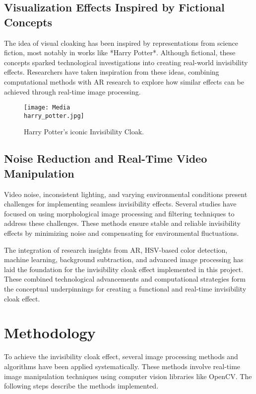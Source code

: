 \documentclass[onecolumn]{article} %
\begin{document}
\subsection{Visualization Effects Inspired by Fictional Concepts}
The idea of visual cloaking has been inspired by representations from science fiction, most notably in works like *Harry Potter*. Although fictional, these concepts sparked technological investigations into creating real-world invisibility effects. Researchers have taken inspiration from these ideas, combining computational methods with AR research to explore how similar effects can be achieved through real-time image processing.

\begin{figure}[h!]
    \centering
    \texttt{[image: Media\\harry\_potter.jpg]}
    \caption{Harry Potter's iconic Invisibility Cloak.}
    \label{fig:hsv_analysis}
\end{figure}

\subsection{Noise Reduction and Real-Time Video Manipulation}
Video noise, inconsistent lighting, and varying environmental conditions present challenges for implementing seamless invisibility effects. Several studies have focused on using morphological image processing and filtering techniques to address these challenges. These methods ensure stable and reliable invisibility effects by minimizing noise and compensating for environmental fluctuations.

The integration of research insights from AR, HSV-based color detection, machine learning, background subtraction, and advanced image processing has laid the foundation for the invisibility cloak effect implemented in this project. These combined technological advancements and computational strategies form the conceptual underpinnings for creating a functional and real-time invisibility cloak effect.



\section{Methodology}
To achieve the invisibility cloak effect, several image processing methods and algorithms have been applied systematically. These methods involve real-time image manipulation techniques using computer vision libraries like OpenCV. The following steps describe the methods implemented.
\end{document}
